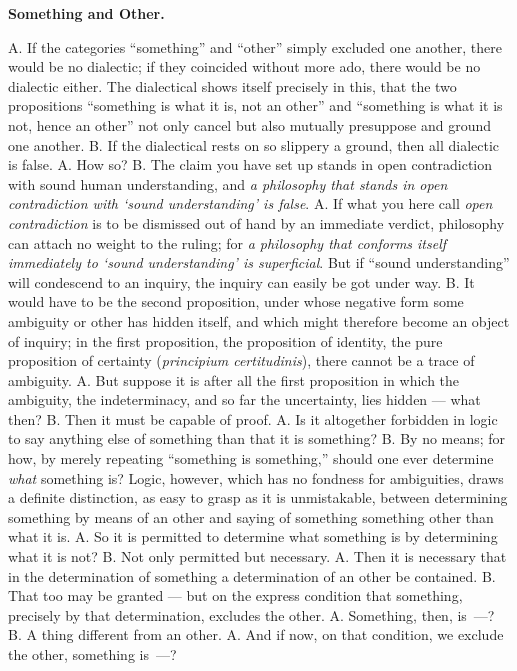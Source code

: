 \documentclass[12pt,a4paper]{book}
\begin{document}
\textbf{Something and Other.}
A. If the categories ``something'' and ``other'' simply excluded one another,
there would be no dialectic; if they coincided without more ado, there would be
no dialectic either. The dialectical shows itself precisely in this, that the
two propositions ``something is what it is, not an other'' and ``something is
what it is not, hence an other'' not only cancel but also mutually presuppose
and ground one another. B. If the dialectical rests on so slippery a ground,
then all dialectic is false. A. How so? B. The claim you have set up stands in
open contradiction with sound human understanding, and \emph{a philosophy that
stands in open contradiction with `sound understanding' is false}. A. If what
you here call \emph{open contradiction} is to be dismissed out of hand by an
immediate verdict, philosophy can attach no weight to the ruling; for \emph{a
philosophy that conforms itself immediately
to `sound understanding' is superficial}. But if ``sound understanding'' will
condescend to an inquiry, the inquiry can easily be got under way. B. It would
have to be the second proposition, under whose negative form some ambiguity or
other has hidden itself, and which might therefore become an object of inquiry;
in the first proposition, the proposition of identity, the pure proposition of
certainty (\textit{principium certitudinis}), there cannot be a trace of
ambiguity. A. But suppose it is after all the first proposition in which the
ambiguity, the indeterminacy, and so far the uncertainty, lies hidden --- what
then? B. Then it must be capable of proof. A. Is it altogether forbidden in
logic to say anything else of something than that it is something? B. By no
means; for how, by merely repeating ``something is something,'' should one ever
determine \emph{what} something is? Logic, however, which has no fondness for
ambiguities, draws a definite distinction, as easy to grasp as it is
unmistakable, between determining something by means of an other and saying of
something something other than what it is. A. So it is permitted to determine
what something is by determining what it is not? B. Not only permitted but
necessary. A. Then it is necessary that in the determination of something a
determination of an other be contained. B. That too may be granted --- but on
the express condition that something, precisely by that determination, excludes
the other. A. Something, then, is~---? B. A thing different from an other.
A. And if now, on that condition, we exclude the other, something is~---?
\end{document}
